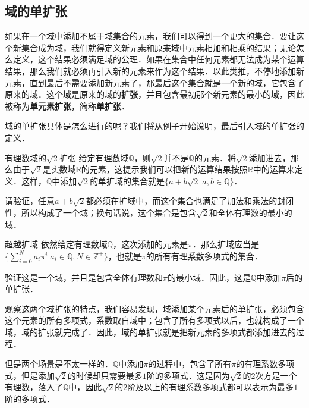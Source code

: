 

\subsection{域的单扩张}
如果在一个域中添加不属于域集合的元素，我们可以得到一个更大的集合．要让这个新集合成为域，我们就得定义新元素和原来域中元素相加和相乘的结果；无论怎么定义，这个结果必须满足域的公理．如果在集合中任何元素都无法成为某个运算结果，那么我们就必须再引入新的元素来作为这个结果．以此类推，不停地添加新元素，直到最后不需要添加新元素了，那最后这个集合就是一个新的域，它包含了原来的域．这个域是原来的域的\textbf{扩张}，并且包含最初那个新元素的最小的域，因此被称为\textbf{单元素扩张}，简称\textbf{单扩张}．

域的单扩张具体是怎么进行的呢？我们将从例子开始说明，最后引入域的单扩张的定义．

\begin{exercise}{有理数域的$\sqrt{2}$扩张}\label{FldExp_exe1}
给定有理数域$\mathbb{Q}$，则$\sqrt{2}$并不是$\mathbb{Q}$的元素．将$\sqrt{2}$添加进去，那么由于$\sqrt{2}$是实数域$\mathbb{R}$的元素，这提示我们可以把新的运算结果按照$\mathbb{R}$中的运算来定义．这样，$\mathbb{Q}$中添加$\sqrt{2}$的单扩域的集合就是$\{a+b\sqrt{2}|a, b\in\mathbb{Q}\}$．

请验证，任意$a+b\sqrt{2}$都必须在扩域中，而这个集合也满足了加法和乘法的封闭性，所以构成了一个域；换句话说，这个集合是包含$\sqrt{2}$和全体有理数的最小的域．
\end{exercise}

\begin{exercise}{超越扩域}\label{FldExp_exe2}
依然给定有理数域$\mathbb{Q}$，这次添加的元素是$\pi$．那么扩域应当是$\{\sum_{i=0}^N a_i\pi^i|a_i\in\mathbb{Q}, N\in\mathbb{Z}^+\}$，也就是$\pi$的所有有理系数多项式的集合．

验证这是一个域，并且是包含全体有理数和$\pi$的最小域．因此，这是$\mathbb{Q}$中添加$\pi$后的单扩张．
\end{exercise}

观察这两个域扩张的特点，我们容易发现，域添加某个元素后的单扩张，必须包含这个元素的所有多项式，系数取自域中；包含了所有多项式以后，也就构成了一个域，域的扩张就完成了．因此，域的单扩张就是把新元素的多项式都添加进去的过程．

但是两个场景是不太一样的．$\mathbb{Q}$中添加$\pi$的过程中，包含了所有$\pi$的有理系数多项式，但是添加$\sqrt{2}$的时候却只需要最多$1$阶的多项式．这是因为$\sqrt{2}$的$2$次方是一个有理数，落入了$\mathbb{Q}$中，因此$\sqrt{2}$的$2$阶及以上的有理系数多项式都可以表示为最多$1$阶的多项式．

